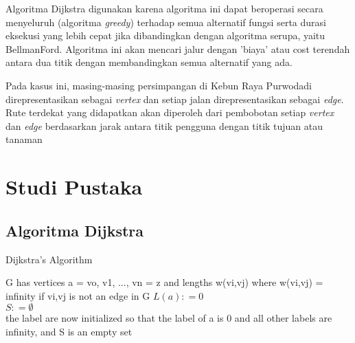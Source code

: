\documentclass[conference]{IEEEtran}
\begin{document}
Algoritma Dijkstra digunakan karena algoritma ini dapat beroperasi secara menyeluruh (algoritma \textit{greedy}) terhadap semua alternatif fungsi serta durasi eksekusi yang lebih cepat jika dibandingkan dengan algoritma serupa, yaitu BellmanFord. Algoritma ini akan mencari jalur dengan ’biaya’ atau cost terendah antara dua titik dengan membandingkan semua alternatif yang ada.

Pada kasus ini, masing-masing persimpangan di Kebun Raya Purwodadi direpresentasikan sebagai \textit{vertex} dan setiap jalan direpresentasikan sebagai \textit{edge}. Rute terdekat yang didapatkan akan diperoleh dari pembobotan setiap  \textit{vertex} dan  \textit{edge} berdasarkan jarak antara titik pengguna dengan titik tujuan atau tanaman

\section{Studi Pustaka}
\subsection{Algoritma Dijkstra}

\begin{algorithm}
\caption{Dijkstra's Algorithm}
{G has vertices a = vo, v1, ..., vn = z and lengths w(vi,vj) where w(vi,vj) = infinity if vi,vj is not an edge in G}
$L(a): = 0$\\
$S: = \emptyset$\\
{the label are now initialized so that the label of a is 0  and all other labels are infinity, and S is an empty set}
\end{algorithm}
\end{document}
